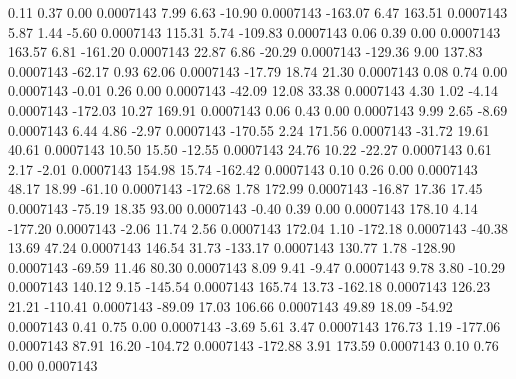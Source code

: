         0.11        0.37        0.00     0.0007143
        7.99        6.63      -10.90     0.0007143
     -163.07        6.47      163.51     0.0007143
        5.87        1.44       -5.60     0.0007143
      115.31        5.74     -109.83     0.0007143
        0.06        0.39        0.00     0.0007143
      163.57        6.81     -161.20     0.0007143
       22.87        6.86      -20.29     0.0007143
     -129.36        9.00      137.83     0.0007143
      -62.17        0.93       62.06     0.0007143
      -17.79       18.74       21.30     0.0007143
        0.08        0.74        0.00     0.0007143
       -0.01        0.26        0.00     0.0007143
      -42.09       12.08       33.38     0.0007143
        4.30        1.02       -4.14     0.0007143
     -172.03       10.27      169.91     0.0007143
        0.06        0.43        0.00     0.0007143
        9.99        2.65       -8.69     0.0007143
        6.44        4.86       -2.97     0.0007143
     -170.55        2.24      171.56     0.0007143
      -31.72       19.61       40.61     0.0007143
       10.50       15.50      -12.55     0.0007143
       24.76       10.22      -22.27     0.0007143
        0.61        2.17       -2.01     0.0007143
      154.98       15.74     -162.42     0.0007143
        0.10        0.26        0.00     0.0007143
       48.17       18.99      -61.10     0.0007143
     -172.68        1.78      172.99     0.0007143
      -16.87       17.36       17.45     0.0007143
      -75.19       18.35       93.00     0.0007143
       -0.40        0.39        0.00     0.0007143
      178.10        4.14     -177.20     0.0007143
       -2.06       11.74        2.56     0.0007143
      172.04        1.10     -172.18     0.0007143
      -40.38       13.69       47.24     0.0007143
      146.54       31.73     -133.17     0.0007143
      130.77        1.78     -128.90     0.0007143
      -69.59       11.46       80.30     0.0007143
        8.09        9.41       -9.47     0.0007143
        9.78        3.80      -10.29     0.0007143
      140.12        9.15     -145.54     0.0007143
      165.74       13.73     -162.18     0.0007143
      126.23       21.21     -110.41     0.0007143
      -89.09       17.03      106.66     0.0007143
       49.89       18.09      -54.92     0.0007143
        0.41        0.75        0.00     0.0007143
       -3.69        5.61        3.47     0.0007143
      176.73        1.19     -177.06     0.0007143
       87.91       16.20     -104.72     0.0007143
     -172.88        3.91      173.59     0.0007143
        0.10        0.76        0.00     0.0007143
